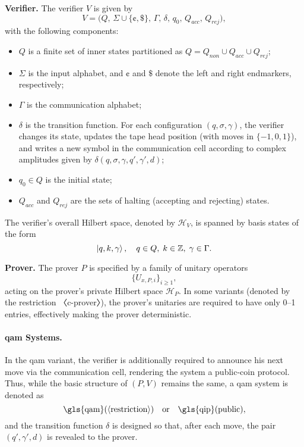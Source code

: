 \textbf{Verifier.} The verifier $V$ is given by
\[
V = \bigl(Q,\, \Sigma \cup \{\cent,\$\},\, \Gamma,\, \delta,\, q_0,\, Q_{acc},\, Q_{rej}\bigr),
\]
with the following components:
\begin{itemize}
  \item $Q$ is a finite set of inner states partitioned as $Q = Q_{non} \cup Q_{acc} \cup Q_{rej}$;
  \item $\Sigma$ is the input alphabet, and $\cent$ and $\$$ denote the left and right endmarkers, respectively;
  \item $\Gamma$ is the communication alphabet;
  \item $\delta$ is the transition function. For each configuration $(q,\sigma,\gamma)$, the verifier changes its state, updates the tape head position (with moves in $\{-1,0,1\}$), and writes a new symbol in the communication cell according to complex amplitudes given by $\delta(q,\sigma,\gamma,q',\gamma',d)$;
  \item $q_0\in Q$ is the initial state;
  \item $Q_{acc}$ and $Q_{rej}$ are the sets of halting (accepting and rejecting) states.
\end{itemize}
The verifier’s overall Hilbert space, denoted by $\mathit{\mathcal{H}}_V$, is spanned by basis states of the form
\[
\ket{q, k, \gamma},\quad q\in Q,\; k\in \mathbb{Z},\; \gamma\in\Gamma.
\]

\textbf{Prover.} The prover $P$ is specified by a family of unitary operators
\[
\{U_{x,P,i}\}_{i\ge1},
\]
acting on the prover’s private Hilbert space $\mathit{\mathcal{H}}_P$. In some variants (denoted by the restriction 〈c-prover〉), the prover’s unitaries are required to have only 0–1 entries, effectively making the prover deterministic.

\paragraph{\gls{qam} Systems.} In the \gls{qam} variant, the verifier is additionally required to announce his next move via the communication cell, rendering the system a public-coin protocol. Thus, while the basic structure of $(P,V)$ remains the same, a \gls{qam} system is denoted as
\[
\text{\gls{qam}}(\langle\text{restriction}\rangle) \quad \text{or} \quad \text{\gls{qip}}(\text{public}),
\]
and the transition function $\delta$ is designed so that, after each move, the pair $(q',\gamma',d)$ is revealed to the prover.

